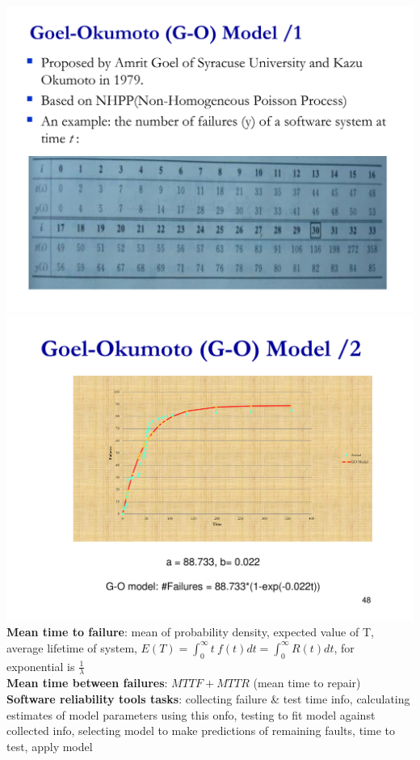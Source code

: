 \documentclass[a4paper]{article}
\begin{document}
\begin{multicols}{3}
        \includegraphics[width=\linewidth]{391.pdf}\\
        \includegraphics[width=\linewidth]{392.pdf}\\
        \textbf{Mean time to failure}: mean of probability density, expected value of T, average lifetime of system, $E(T) = \int_0^\infty t \: f(t)dt = \int_0^\infty R(t)dt$, for exponential is $\frac{1}{\lambda}$\\
        \textbf{Mean time between failures}: $MTTF + MTTR$ (mean time to repair)\\
        \textbf{Software reliability tools tasks}: collecting failure \& test time info, calculating estimates of model parameters using this onfo, testing to fit model against collected info, selecting model to make predictions of remaining faults, time to test, apply model\\
    \end{multicols}
    
\end{document}
